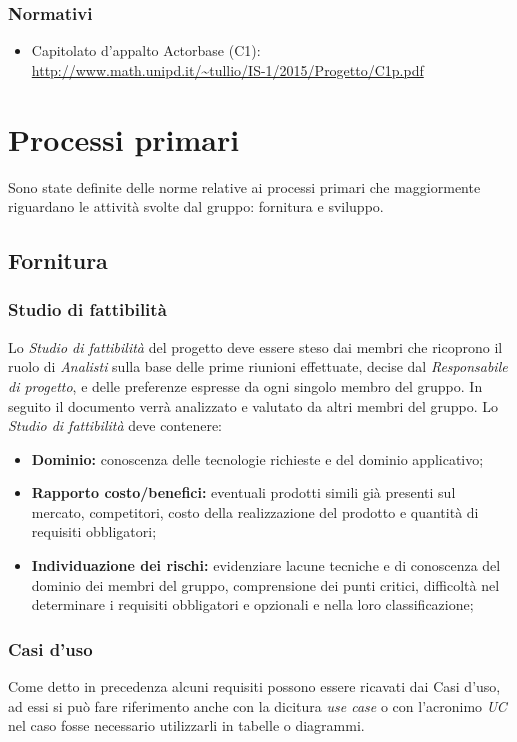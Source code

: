 \documentclass[a4paper]{article}
\begin{document}
			\subsubsection{Normativi}
				\begin{itemize}
					\item Capitolato d'appalto Actorbase (C1): \\
					\url{http://www.math.unipd.it/~tullio/IS-1/2015/Progetto/C1p.pdf}
				\end{itemize}

	\newpage
	\section{Processi primari}
		Sono state definite delle norme relative ai processi primari che maggiormente riguardano le attività
		svolte dal gruppo: fornitura e sviluppo.
		\subsection{Fornitura}
		\subsubsection{Studio di fattibilità}
		Lo \emph{Studio di fattibilità} del progetto deve essere steso dai membri che ricoprono il ruolo di 
		\emph{Analisti} sulla base delle prime riunioni effettuate, decise dal \emph{Responsabile di progetto},
		e delle preferenze espresse da ogni singolo membro del gruppo.
		In seguito il documento verrà analizzato e valutato da altri membri del gruppo. 
		Lo \emph{Studio di fattibilità} deve contenere:
		\begin{itemize}
			\item \textbf{Dominio:} conoscenza delle tecnologie richieste e del dominio applicativo;
			\item \textbf{Rapporto costo/benefici:} eventuali prodotti simili già presenti sul mercato,
			competitori, costo della
			realizzazione del prodotto e quantità di requisiti obbligatori;
			\item \textbf{Individuazione dei rischi:} evidenziare lacune tecniche e di conoscenza del dominio
			dei membri del gruppo, comprensione
			dei punti critici, difficoltà nel determinare i requisiti obbligatori e opzionali e nella loro
			classificazione;
		\end{itemize}

		\subsubsection{Casi d'uso}
			Come detto in precedenza alcuni requisiti possono essere ricavati dai Casi d'uso, ad essi si
			può fare riferimento anche con la dicitura \emph{use case} o con l'acronimo \emph{UC} nel caso
			fosse  necessario utilizzarli in tabelle o diagrammi.
\end{document}
